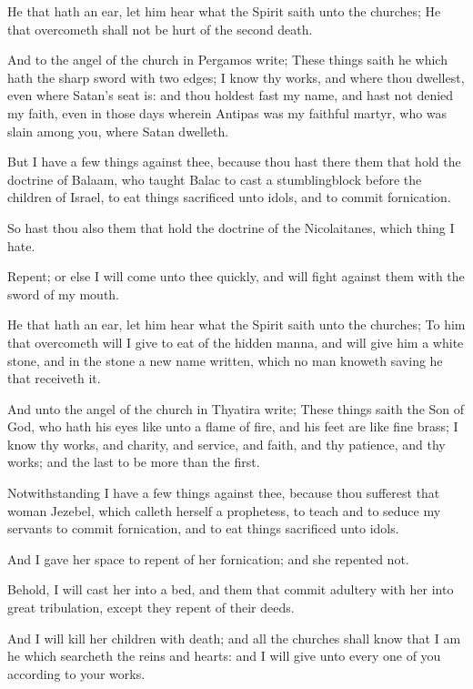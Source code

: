 \Verse He that hath an ear, let him hear what the Spirit saith unto the churches; He that overcometh shall not be hurt of the second death.

\Verse And to the angel of the church in Pergamos write; These things saith he which hath the sharp sword with two edges; \Verse I know thy works, and where thou dwellest, even where Satan's seat is: and thou holdest fast my name, and hast not denied my faith, even in those days wherein Antipas was my faithful martyr, who was slain among you, where Satan dwelleth.

\Verse But I have a few things against thee, because thou hast there them that hold the doctrine of Balaam, who taught Balac to cast a stumblingblock before the children of Israel, to eat things sacrificed unto idols, and to commit fornication.

\Verse So hast thou also them that hold the doctrine of the Nicolaitanes, which thing I hate.

\Verse Repent; or else I will come unto thee quickly, and will fight against them with the sword of my mouth.

\Verse He that hath an ear, let him hear what the Spirit saith unto the churches; To him that overcometh will I give to eat of the hidden manna, and will give him a white stone, and in the stone a new name written, which no man knoweth saving he that receiveth it.

\Verse And unto the angel of the church in Thyatira write; These things saith the Son of God, who hath his eyes like unto a flame of fire, and his feet are like fine brass; \Verse I know thy works, and charity, and service, and faith, and thy patience, and thy works; and the last to be more than the first.

\Verse Notwithstanding I have a few things against thee, because thou sufferest that woman Jezebel, which calleth herself a prophetess, to teach and to seduce my servants to commit fornication, and to eat things sacrificed unto idols.

\Verse And I gave her space to repent of her fornication; and she repented not.

\Verse Behold, I will cast her into a bed, and them that commit adultery with her into great tribulation, except they repent of their deeds.

\Verse And I will kill her children with death; and all the churches shall know that I am he which searcheth the reins and hearts: and I will give unto every one of you according to your works.

